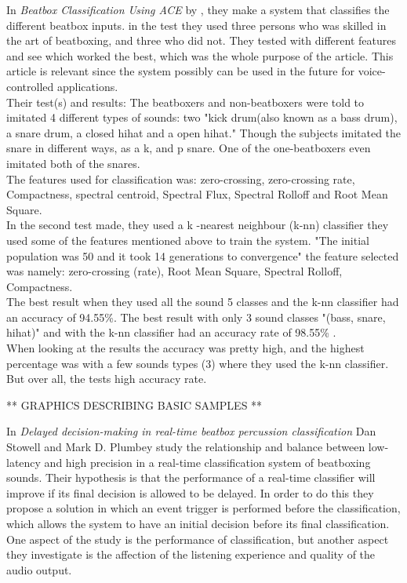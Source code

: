 In \textit{Beatbox Classification Using ACE} by \cite{Sinyor05}, they make a system that classifies the different beatbox inputs. in the test they used three persons who was skilled in the art of beatboxing, and three who did not.\cite{Sinyor05} They tested with different features and see which worked the best, which  was the whole purpose of the article. This article is relevant since the system possibly can be used in the future for voice-controlled applications.\\
Their test(s) and results:
The beatboxers and non-beatboxers were told to imitated 4 different types of sounds: two "kick drum(also known as a bass drum), a snare drum, a closed hihat and a open hihat."\cite{Sinyor05} Though the subjects imitated the snare in different ways, as a k, and p snare. One of the one-beatboxers even imitated both of the snares.\\
The features \cite{Sinyor05} used for classification was: zero-crossing, zero-crossing rate, Compactness, spectral centroid, Spectral Flux, Spectral Rolloff and Root Mean Square\cite{Sinyor05}.\\
In the second test \cite{Sinyor05} made, they used a k -nearest neighbour (k-nn) classifier they used some of the features mentioned above to train the system. "The initial population was 50 and it took 14 generations to convergence" \cite{Sinyor05} the feature selected was namely: zero-crossing (rate), Root Mean Square, Spectral Rolloff, Compactness.\\ 
The best result when they used all the sound 5 classes and the k-nn classifier had an accuracy of 94.55\%. The best result with only 3 sound classes "(bass, snare, hihat)" \cite{Sinyor05} and with the k-nn classifier had an accuracy rate of 98.55\% \cite{Sinyor05}.\\
When looking at the results the accuracy was pretty high, and the highest percentage was with a few sounds types (3)  where they used the k-nn classifier. But over all, the tests high accuracy rate.

** GRAPHICS DESCRIBING BASIC SAMPLES ** 

In \textit{Delayed decision-making in real-time beatbox percussion classification} Dan Stowell and Mark D. Plumbey study the relationship and balance between low-latency and high precision in a real-time classification system of beatboxing sounds. Their hypothesis is that the performance of a real-time classifier will improve if its final decision is allowed to be delayed. 
In order to do this they propose a solution in which an event trigger is performed before the classification, which allows the system to have an initial decision before its final classification. One aspect of the study is the performance of classification, but another aspect they investigate is the affection of the listening experience and quality of the audio output. 

